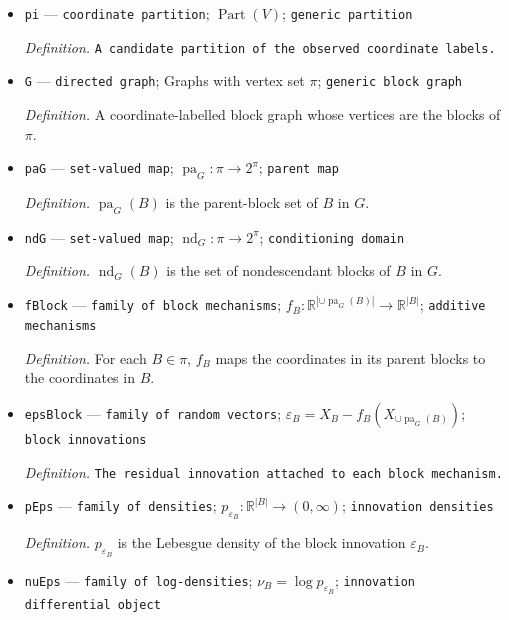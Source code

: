 \documentclass{article}
\begin{document}
\begin{itemize}
  \par\smallskip\noindent\emph{Definition.} \(\ell_P=\log p_P\), where \(p_P\) is the density derived by the triangular observed-density lemma.
  \item \texttt{pi} --- \texttt{coordinate partition}; \(\operatorname{Part}(V)\); \texttt{generic partition}
  \par\smallskip\noindent\emph{Definition.} \texttt{A candidate partition of the observed coordinate labels.}
  \item \texttt{G} --- \texttt{directed graph}; Graphs with vertex set \(\pi\); \texttt{generic block graph}
  \par\smallskip\noindent\emph{Definition.} A coordinate-labelled block graph whose vertices are the blocks of \(\pi\).
  \item \texttt{paG} --- \texttt{set-\allowbreak{}valued map}; \(\operatorname{pa}_G:\pi\to2^{\pi}\); \texttt{parent map}
  \par\smallskip\noindent\emph{Definition.} \(\operatorname{pa}_G(B)\) is the parent-block set of \(B\) in \(G\).
  \item \texttt{ndG} --- \texttt{set-\allowbreak{}valued map}; \(\operatorname{nd}_G:\pi\to2^{\pi}\); \texttt{conditioning domain}
  \par\smallskip\noindent\emph{Definition.} \(\operatorname{nd}_G(B)\) is the set of nondescendant blocks of \(B\) in \(G\).
  \item \texttt{fBlock} --- \texttt{family of block mechanisms}; \(f_B:\mathbb R^{|\cup\operatorname{pa}_G(B)|}\to\mathbb R^{|B|}\); \texttt{additive mechanisms}
  \par\smallskip\noindent\emph{Definition.} For each \(B\in\pi\), \(f_B\) maps the coordinates in its parent blocks to the coordinates in \(B\).
  \item \texttt{epsBlock} --- \texttt{family of random vectors}; \(\varepsilon_B=X_B-f_B(X_{\cup\operatorname{pa}_G(B)})\); \texttt{block innovations}
  \par\smallskip\noindent\emph{Definition.} \texttt{The residual innovation attached to each block mechanism.}
  \item \texttt{pEps} --- \texttt{family of densities}; \(p_{\varepsilon_B}:\mathbb R^{|B|}\to(0,\infty)\); \texttt{innovation densities}
  \par\smallskip\noindent\emph{Definition.} \(p_{\varepsilon_B}\) is the Lebesgue density of the block innovation \(\varepsilon_B\).
  \item \texttt{nuEps} --- \texttt{family of log-\allowbreak{}densities}; \(\nu_B=\log p_{\varepsilon_B}\); \texttt{innovation differential object}

\end{itemize}
\end{document}
